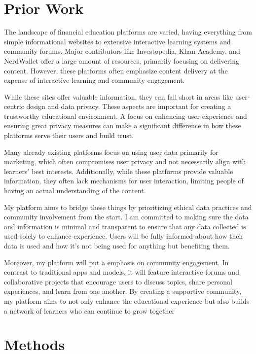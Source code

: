 \documentclass[12pt,twocolumn]{article}
\begin{document}
\section{Prior Work}

The landscape of financial education platforms are varied, having everything from simple informational websites to extensive interactive learning systems and community forums. Major contributors like Investopedia, Khan Academy, and NerdWallet offer a large amount of resources, primarily focusing on delivering content. However, these platforms often emphasize content delivery at the expense of interactive learning and community engagement.

While these sites offer valuable information, they can fall short in areas like user-centric design and data privacy. These aspects are important for creating a trustworthy educational environment. A focus on enhancing user experience and ensuring great privacy measures can make a significant difference in how these platforms serve their users and build trust.


Many already existing platforms focus on using user data primarily for  marketing, which often compromises user privacy and not necessarily align with learners' best interests. Additionally, while these platforms provide valuable information, they often lack mechanisms for user interaction, limiting people of having an actual understanding of the content. 

My platform aims to bridge these things by prioritizing ethical data practices and community involvement from the start. I am committed to making sure the data and information is minimal and transparent to ensure that any data collected is used solely to enhance experience. Users will be fully informed about how their data is used and how it's not being used for anything but benefiting them. 

Moreover, my platform will put a emphasis on community engagement. In contrast to traditional apps and models, it will feature interactive forums and collaborative projects that encourage users to discuss topics, share personal experiences, and learn from one another. By creating a supportive community, my platform aims to not only enhance the educational experience but also builds a network of learners who can continue to grow together



\section{Methods}
\end{document}
